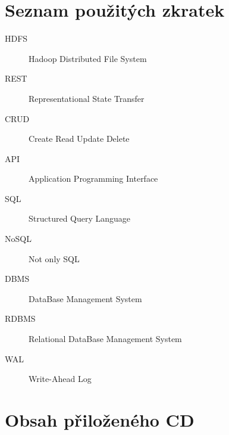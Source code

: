 \documentclass[thesis=M,czech]{FITthesis}[2012/06/26]
\begin{document}
\chapter{Seznam použitých zkratek}
\begin{description}
	\item[HDFS] Hadoop Distributed File System
	\item[REST] Representational State Transfer
	\item[CRUD] Create Read Update Delete
	\item[API] Application Programming Interface
	\item[SQL] Structured Query Language
	\item[NoSQL] Not only SQL
	\item[DBMS] DataBase Management System
	\item[RDBMS] Relational DataBase Management System
	\item[WAL] Write-Ahead Log
	

\end{description}


\chapter{Obsah přiloženého CD}


\begin{figure}
\end{figure}
\end{document}
